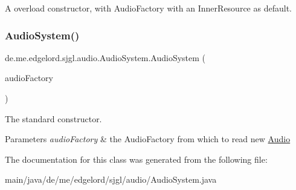 A overload constructor, with {\ttfamily Audio\+Factory} with an {\ttfamily Inner\+Resource} as default. \mbox{\label{classde_1_1me_1_1edgelord_1_1sjgl_1_1audio_1_1_audio_system_a332604b3b6fce17335bf6180ba15dd9b}} 
\subsubsection{\texorpdfstring{Audio\+System()}{AudioSystem()}\hspace{0.1cm}{\footnotesize\ttfamily [2/2]}}
{\footnotesize\ttfamily de.\+me.\+edgelord.\+sjgl.\+audio.\+Audio\+System.\+Audio\+System (\begin{DoxyParamCaption}\item[{\mbox{\hyperlink{classde_1_1me_1_1edgelord_1_1sjgl_1_1factory_1_1_audio_factory}{Audio\+Factory}}}]{audio\+Factory }\end{DoxyParamCaption})}

The standard constructor.


\begin{DoxyParams}{Parameters}
{\em audio\+Factory} & the {\ttfamily Audio\+Factory} from which to read new {\ttfamily \mbox{\hyperlink{classde_1_1me_1_1edgelord_1_1sjgl_1_1audio_1_1_audio}{Audio}}} \\
\hline
\end{DoxyParams}


The documentation for this class was generated from the following file\+:\begin{DoxyCompactItemize}
\item 
main/java/de/me/edgelord/sjgl/audio/Audio\+System.\+java\end{DoxyCompactItemize}
